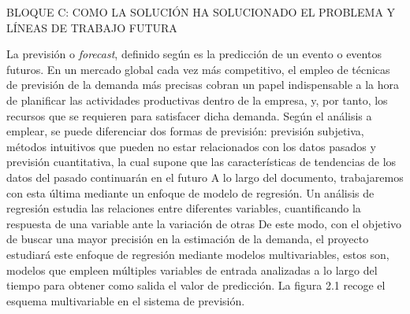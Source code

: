 BLOQUE C: COMO LA SOLUCIÓN HA SOLUCIONADO EL PROBLEMA Y LÍNEAS DE TRABAJO FUTURA








La previsión o \textit{forecast}, definido según  es la predicción de un evento o eventos futuros. En un mercado global cada vez más competitivo, el empleo de técnicas de previsión de la demanda más precisas cobran un papel indispensable a la hora de planificar las actividades productivas dentro de la empresa, y, por tanto, los recursos que se requieren para satisfacer dicha demanda. Según el análisis a emplear, se puede diferenciar dos formas de previsión: previsión subjetiva, métodos intuitivos que pueden no estar relacionados con los datos pasados y previsión cuantitativa, la cual supone que las características de tendencias de los datos del pasado continuarán en el futuro  A lo largo del documento, trabajaremos con esta última mediante un enfoque de modelo de regresión. Un análisis de regresión estudia las relaciones entre diferentes variables, cuantificando la respuesta de una variable ante la variación de otras  De este modo, con el objetivo de buscar una mayor precisión en la estimación de la demanda, el proyecto estudiará este enfoque de regresión mediante modelos multivariables, estos son, modelos que empleen múltiples variables de entrada analizadas a lo largo del tiempo para obtener como salida el valor de predicción. La figura 2.1 recoge el esquema multivariable en el sistema de previsión.